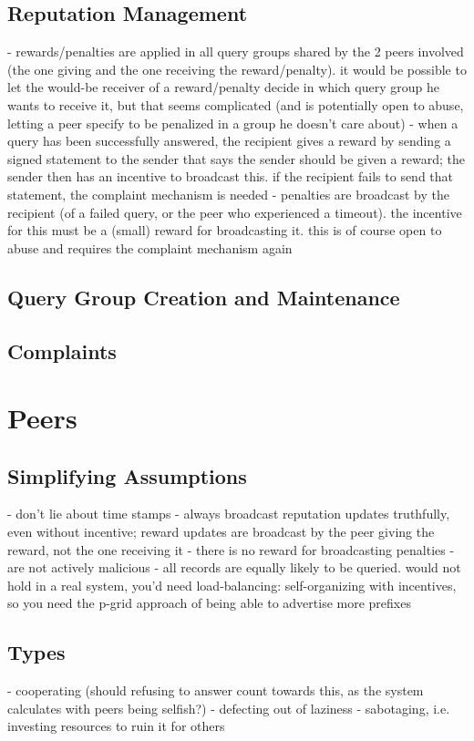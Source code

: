 \subsection{Reputation Management}
- rewards/penalties are applied in all query groups shared by the 2 peers
  involved (the one giving and the one receiving the reward/penalty). it would
  be possible to let the would-be receiver of a reward/penalty decide in which
  query group he wants to receive it, but that seems complicated (and is
  potentially open to abuse, letting a peer specify to be penalized in a group
  he doesn't care about)
- when a query has been successfully answered, the recipient gives a reward by
  sending a signed statement to the sender that says the sender should be given
  a reward; the sender then has an incentive to broadcast this. if the recipient
  fails to send that statement, the complaint mechanism is needed
- penalties are broadcast by the recipient (of a failed query, or the peer who
  experienced a timeout). the incentive for this must be a (small) reward for
  broadcasting it. this is of course open to abuse and requires the complaint
  mechanism again
\subsection{Query Group Creation and Maintenance}
\subsection{Complaints}

\section{Peers}
\subsection{Simplifying Assumptions}
- don't lie about time stamps
- always broadcast reputation updates truthfully, even without incentive; reward
  updates are broadcast by the peer giving the reward, not the one receiving it
- there is no reward for broadcasting penalties
- are not actively malicious
- all records are equally likely to be queried. would not hold in a real system,
  you'd need load-balancing: self-organizing with incentives, so you need the
  p-grid approach of being able to advertise more prefixes
\subsection{Types}
- cooperating (should refusing to answer count towards this, as the system
  calculates with peers being selfish?)
- defecting out of laziness
- sabotaging, i.e. investing resources to ruin it for others

